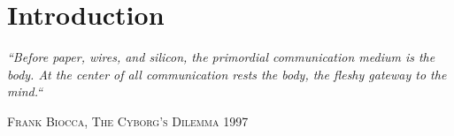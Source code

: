



\chapter{Introduction}
\label{ch:intro}

\begin{flushright}


\textit{``Before paper, wires, and silicon, the primordial communication medium is the body. At the
center of all communication rests the body, the fleshy gateway to the mind.``} 
\par\hfill\textsc{Frank Biocca, The Cyborg's Dilemma 1997}


\end{flushright}
\vspace{15pt}


